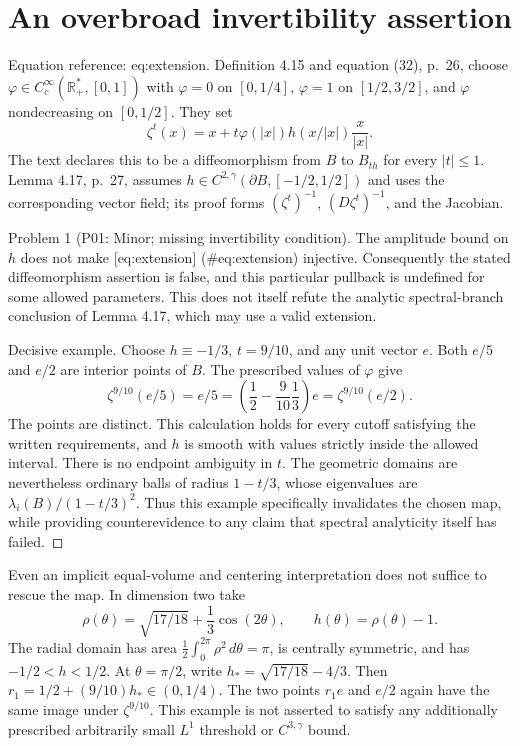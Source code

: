 \documentclass[10pt]{article}
\begin{document}
\section*{An overbroad invertibility assertion}
Equation reference: eq:extension. Definition 4.15 and equation (32), p. 26, choose \(\varphi\in C_c^\infty(\mathbb R_+^*,[0,1])\) with \(\varphi=0\) on \([0,1/4]\), \(\varphi=1\) on \([1/2,3/2]\), and \(\varphi\) nondecreasing on \([0,1/2]\). They set \[
 \zeta^t(x)=x+t\varphi(|x|)h(x/|x|)\frac{x}{|x|}.\] The text declares this to be a diffeomorphism from \(B\) to \(B_{th}\) for every \(|t|\leq1\). Lemma 4.17, p. 27, assumes \(h\in C^{2,\gamma}(\partial B,[-1/2,1/2])\) and uses the corresponding vector field; its proof forms \((\zeta^t)^{-1}\), \((D\zeta^t)^{-1}\), and the Jacobian.\par
Problem 1 (P01: Minor; missing invertibility condition).  The amplitude bound on \(h\) does not make [eq:extension] (\#eq:extension) injective. Consequently the stated diffeomorphism assertion is false, and this particular pullback is undefined for some allowed parameters. This does not itself refute the analytic spectral-branch conclusion of Lemma 4.17, which may use a valid extension.\par
Decisive example. Choose \(h\equiv-1/3\), \(t=9/10\), and any unit vector \(e\). Both \(e/5\) and \(e/2\) are interior points of \(B\). The prescribed values of \(\varphi\) give \[\zeta^{9/10}(e/5)=e/5
 =\left(\frac12-\frac9{10}\frac13\right)e
 =\zeta^{9/10}(e/2).\] The points are distinct. This calculation holds for every cutoff satisfying the written requirements, and \(h\) is smooth with values strictly inside the allowed interval. There is no endpoint ambiguity in \(t\). The geometric domains are nevertheless ordinary balls of radius \(1-t/3\), whose eigenvalues are \(\lambda_i(B)/(1-t/3)^2\). Thus this example specifically invalidates the chosen map, while providing counterevidence to any claim that spectral analyticity itself has failed. ◻\par
Even an implicit equal-volume and centering interpretation does not suffice to rescue the map. In dimension two take \[\rho(\theta)=\sqrt{17/18}+\frac13\cos(2\theta),
 \qquad h(\theta)=\rho(\theta)-1.\] The radial domain has area \(\frac12\int_0^{2\pi}\rho^2\,d\theta=\pi\), is centrally symmetric, and has \(-1/2<h<1/2\). At \(\theta=\pi/2\), write \(h_*=\sqrt{17/18}-4/3\). Then \(r_1=1/2+(9/10)h_*\in(0,1/4)\). The two points \(r_1e\) and \(e/2\) again have the same image under \(\zeta^{9/10}\). This example is not asserted to satisfy any additionally prescribed arbitrarily small \(L^1\) threshold or \(C^{3,\gamma}\) bound.\par
\end{document}
